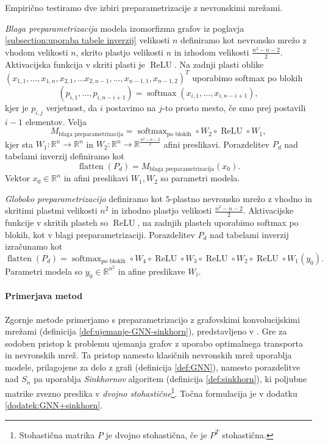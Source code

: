 \documentclass[mat2, tisk]{fmfdelo}
\newcommand{\R}{\mathbb R}
\begin{document}
Empirično testiramo dve izbiri preparametrizacije z
nevronskimi mrežami.
\begin{definicija}

  \emph{Blaga preparametrizacija} modela izomorfizma
  grafov iz poglavja \ref{subsection:uporaba tabele
  inverzij} velikosti $n$ definiramo kot
  nevronsko mrežo z vhodom velikosti $n$, skrito plastjo
  velikosti $n$ in izhodom
  velikosti $\frac{n^2 -n - 2}{2}$. Aktivacijska funkcija v
  skriti plasti je $\operatorname{ReLU}$.
  Na zadnji plasti oblike  $(x_{1,1}, \dotsc, x_{1, n},
  x_{2, 1}, \dotsc x_{2, n -1}, \dotsc, x_{n-1, 1}, x_{n-1, 2} )^T$
  uporabimo softmax po blokih
  $$(p_{i, 1}, \dotsc, p_{i, n - i + 1}) =
  \operatorname{softmax}(x_{i, 1}, \dotsc, x_{i, n - i + 1}),$$
  kjer je $p_{i,j}$ verjetnost, da $i$ postavimo na $j$-to
  prosto mesto, če smo prej
  postavili $i-1$ elementov.
  Velja
  $$
  M_{\text{blaga preparametrizacija}} =
  \operatorname{softmax}_\text{po blokih} \circ W_2 \circ
  \operatorname{ReLU} \circ W_1,
  $$
  kjer sta $W_1 \colon \R^n \to \R^n$ in
  $W_2 \colon \R^n \to \R^{\frac{n^2 - n - 2}{2}}$ afini preslikavi.
  Porazdelitev $P_d$ nad tabelami inverzij definiramo kot
  $$
  \operatorname{flatten}(P_d) = M_{\text{blaga
  preparametrizacija}}(x_0).
  $$
  Vektor $x_0 \in \R^n$ in afini preslikavi $W_1, W_2$ so
  parametri modela.
\end{definicija}
%
\begin{definicija}
  \emph{Globoko preparametrizacijo} definiramo
  kot $5$-plastno nevronsko mrežo
  z vhodno in skritimi plastmi velikosti $n^2$ in izhodno
  plastjo velikosti
  $\frac{n^2 - n - 2}{2}$. Aktivacijske funkcije v skritih
  plasteh so $\operatorname{ReLU}$, na zadnjih plasteh
  uporabimo softmax po blokih, kot v blagi preparametrizaciji.
  Porazdelitev $P_d$ nad tabelami inverzij izračunamo kot
  $$
  \operatorname{flatten}(P_d) =
  \operatorname{softmax}_\text{po blokih} \circ
  W_4\circ
  \operatorname{ReLU} \circ
  W_3 \circ
  \operatorname{ReLU} \circ
  W_2 \circ
  \operatorname{ReLU} \circ
  W_1
  (y_0).
  $$
  Parametri modela so  $y_0 \in \R^{n^2}$ in
  afine preslikave
  $W_i$.
\end{definicija}
\paragraph{Primerjava metod}
Zgornje metode primerjamo s preparametrizacijo z
grafovskimi konvolucijskimi mrežami (definicija
\ref{def:ujemanje-GNN-sinkhorn}), predstavljeno v
\cite{graphoptimaltransport2020crossdomainalignment}.
Gre za sodoben pristop k problemu ujemanja grafov z
uporabo optimalnega transporta in nevronskih mrež.
Ta pristop namesto klasičnih nevronskih mrež uporablja
modele, prilagojene za delo z grafi (definicija
\ref{def:GNN}), namesto
porazdelitve nad $S_n$ pa uporablja
\emph{Sinkhornov} algoritem (definicija \ref{def:sinkhorn}),
ki poljubne matrike zvezno preslika v
\emph{dvojno stohastične}\footnote{Stohastična matrika $P$ je
  dvojno stohastična, če je $P^T$ stohastična.
}. Točna formulacija je v dodatku \ref{dodatek:GNN+sinkhorn}.
%
\end{document}
